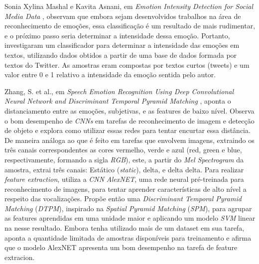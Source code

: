 Sonia Xylina Mashal e Kavita Asnani, em\textit{ Emotion Intensity Detection for Social Media Data }\cite{14}, observam que embora sejam desenvolvidos trabalhos na área de reconhecimento de emoções, essa classificação é um resultado de mais rudimentar, e o próximo passo seria determinar a intensidade dessa emoção. Portanto, investigaram um classificador para determinar a intensidade das emoções em textos, utilizando dados obtidos a partir de uma base de dados formada por textos do Twitter. As amostras eram compostas por textos curtos (tweets) e um valor entre 0 e 1 relativo a intensidade da emoção sentida pelo autor.

Zhang, S. et al., em \textit{Speech Emotion Recognition Using Deep Convolutional Neural Network and Discriminant Temporal Pyramid Matching} \cite{32.25}, aponta o distanciamento entre as emoções, subjetivas, e as features de baixo nível. Observa o bom desempenho de \textit{CNNs} em tarefas de reconhecimento de imagem e detecção de objeto e explora como utilizar essas redes para tentar encurtar essa distância. De maneira análoga ao que é feito em tarefas que envolvem imagens, extraindo os três canais correspondentes as cores vermelho, verde e azul (red, green e blue, respectivamente, formando a sigla \textit{RGB}), este, a partir do \textit{Mel Spectrogram} da amostra, extrai três canais: Estático (\textit{static}), delta, e delta delta. Para realizar \textit{feature extraction}, utiliza a \textit{CNN} \textit{AlexNET}, uma rede neural pré-treinada para reconhecimento de imagens, para tentar aprender características de alto nível a respeito das vocalizações. Propõe então uma \textit{Discriminant Temporal Pyramid Matching} (\textit{DTPM}), inspirado na \textit{Spatial Pyramid Matching} (\textit{SPM}), para agrupar as features aprendidas em uma unidade maior e aplicando um modelo \textit{SVM} linear na nesse resultado. Embora tenha utilizado mais de um dataset em sua tarefa, \cite{32.25} aponta a quantidade limitada de amostras disponíveis para treinamento e afirma que o modelo AlexNET apresenta um bom desempenho na tarefa de feature extracion.

